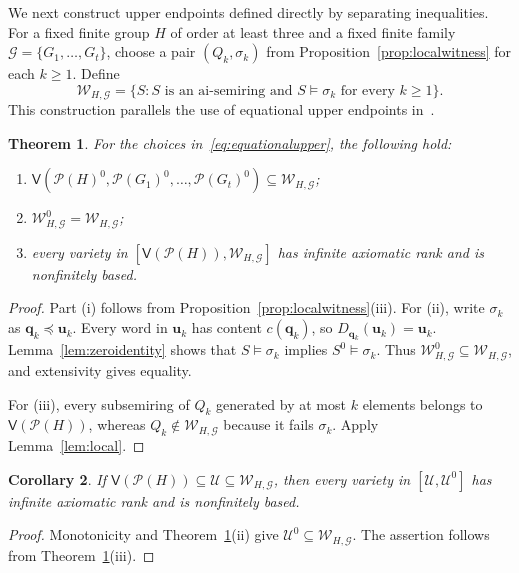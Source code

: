 \documentclass[10pt,a4paper]{amsart}
\newtheorem{theorem}{Theorem}[section]
\newtheorem{corollary}[theorem]{Corollary}
\numberwithin{equation}{section}
\newcommand{\Pow}{\mathcal{P}}
\newcommand{\Full}[1]{\mathcal{P}(#1)^0}
\newcommand{\Var}{\mathsf{V}}
\newcommand{\bu}{\mathbf{u}}
\newcommand{\bq}{\mathbf{q}}
\newcommand{\calG}{\mathcal{G}}
\newcommand{\calU}{\mathcal{U}}
\newcommand{\calW}{\mathcal{W}}
\renewcommand{\geq}{\geqslant}
\begin{document}
We next construct upper endpoints defined directly by separating inequalities. For a fixed finite group $H$ of order at least three and a fixed finite family $\calG=\{G_1,\ldots,G_t\}$, choose a pair $(Q_k,\sigma_k)$ from Proposition~\ref{prop:localwitness} for each $k\geq 1$. Define
\begin{equation}\label{eq:equationalupper}
 \calW_{H,\calG}
 =\{S:S\text{ is an ai-semiring and }S\models\sigma_k
       \text{ for every }k\geq 1\}.
\end{equation}
This construction parallels the use of equational upper endpoints in~\cite[Theorem~3.4]{grsy}.

\begin{theorem}\label{thm:envelope}
For the choices in~\eqref{eq:equationalupper}, the following hold:
\begin{enumerate}[label=\textup{(\roman*)},leftmargin=2.4em]
\item $\Var(\Full{H},\Full{G_1},\ldots,\Full{G_t})\subseteq\calW_{H,\calG}$;
\item $\calW_{H,\calG}^0=\calW_{H,\calG}$;
\item every variety in $[\Var(\Pow(H)),\calW_{H,\calG}]$ has infinite axiomatic rank and is nonfinitely based.
\end{enumerate}
\end{theorem}
\begin{proof}
Part (i) follows from Proposition~\ref{prop:localwitness}(iii). For (ii), write $\sigma_k$ as $\bq_k\preceq\bu_k$. Every word in $\bu_k$ has content $c(\bq_k)$, so $D_{\bq_k}(\bu_k)=\bu_k$. Lemma~\ref{lem:zeroidentity} shows that $S\models\sigma_k$ implies $S^0\models\sigma_k$. Thus $\calW_{H,\calG}^0\subseteq\calW_{H,\calG}$, and extensivity gives equality.

For (iii), every subsemiring of $Q_k$ generated by at most $k$ elements belongs to $\Var(\Pow(H))$, whereas $Q_k\notin\calW_{H,\calG}$ because it fails $\sigma_k$. Apply Lemma~\ref{lem:local}.
\end{proof}

\begin{corollary}\label{cor:envelopezero}
If $\Var(\Pow(H))\subseteq\calU\subseteq\calW_{H,\calG}$, then every variety in $[\calU,\calU^0]$ has infinite axiomatic rank and is nonfinitely based.
\end{corollary}
\begin{proof}
Monotonicity and Theorem~\ref{thm:envelope}(ii) give $\calU^0\subseteq\calW_{H,\calG}$. The assertion follows from Theorem~\ref{thm:envelope}(iii).
\end{proof}
\end{document}
